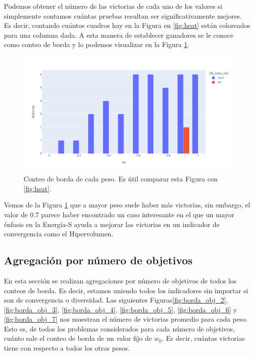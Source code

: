 Podemos obtener el número de las victorias de cada uno de los valores si simplemente contamos cuántas pruebas resultan ser significativamente mejores. Es decir, contando cuántos cuadros hay en la Figura en \ref{fig:heat} están coloreados para una columna dada. A esta manera de establecer ganadores se le conoce como conteo de borda y lo podemos visualizar en la Figura \ref{fig:borda_problema}.

\begin{figure}[H]
    \centering
    \includegraphics[width=\textwidth]{Figuras/conteo_borda_WFG4_obj3_indhv.pdf}
    \caption[Conteo de borda]{Conteo de borda de cada peso. Es útil comparar esta Figura con \ref{fig:heat}.}
    \label{fig:borda_problema}
\end{figure}

Vemos de la Figura \ref{fig:borda_problema} que a mayor peso suele haber más victorias, sin embargo, el valor de 0.7 parece haber encontrado un caso interesante en el que un mayor énfasis en la Energía-S ayuda a mejorar las victorias en un indicador de convergencia como el Hipervolumen. 

\subsection{Agregación por número de objetivos}

En esta sección se realizan agregaciones por número de objetivos de todos los conteos de borda. Es decir, estamos uniendo todos los indicadores sin importar si son de convergencia o diversidad. Las siguientes Figuras\ref{fig:borda_obj_2}, \ref{fig:borda_obj_3}, \ref{fig:borda_obj_4}, \ref{fig:borda_obj_5}, \ref{fig:borda_obj_6} y  \ref{fig:borda_obj_7} nos muestran el número de victorias promedio para cada peso. Esto es, de todos los problemas considerados para cada número de objetivos, cuánto sale el conteo de borda de un valor fijo de $w_0$. Es decir, cuántas victorias tiene con respecto a todos los otros pesos.   

